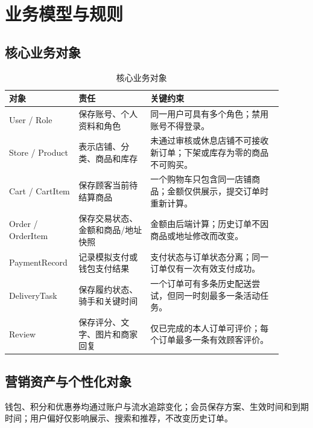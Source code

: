 \section{业务模型与规则}

\subsection{核心业务对象}

\begin{longtable}{|L{0.19\linewidth}|L{0.25\linewidth}|L{0.46\linewidth}|}
\caption{核心业务对象}\label{tab:domain-objects}\\ \hline
\textbf{对象} & \textbf{责任} & \textbf{关键约束} \\ \hline
User / Role & 保存账号、个人资料和角色 & 同一用户可具有多个角色；禁用账号不得登录。 \\ \hline
Store / Product & 表示店铺、分类、商品和库存 & 未通过审核或休息店铺不可接收新订单；下架或库存为零的商品不可购买。 \\ \hline
Cart / CartItem & 保存顾客当前待结算商品 & 一个购物车只包含同一店铺商品；金额仅供展示，提交订单时重新计算。 \\ \hline
Order / OrderItem & 保存交易状态、金额和商品/地址快照 & 金额由后端计算；历史订单不因商品或地址修改而改变。 \\ \hline
Payment\-Record & 记录模拟支付或钱包支付结果 & 支付状态与订单状态分离；同一订单仅有一次有效支付成功。 \\ \hline
DeliveryTask & 保存履约状态、骑手和关键时间 & 一个订单可有多条历史配送尝试，但同一时刻最多一条活动任务。 \\ \hline
Review & 保存评分、文字、图片和商家回复 & 仅已完成的本人订单可评价；每个订单最多一条有效顾客评价。 \\ \hline
\end{longtable}


\subsection{营销资产与个性化对象}

钱包、积分和优惠券均通过账户与流水追踪变化；会员保存方案、生效时间和到期时间；用户偏好仅影响展示、搜索和推荐，不改变历史订单。


